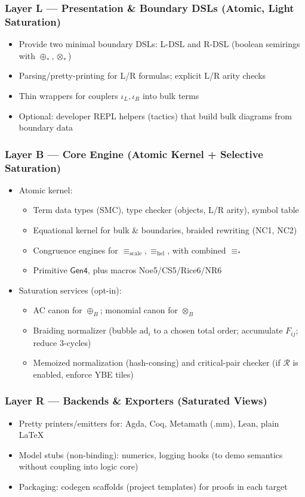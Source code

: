 \subsubsection{Layer L — Presentation \& Boundary DSLs (Atomic, Light Saturation)}
\begin{itemize}
\item Provide two minimal boundary DSLs: L-DSL and R-DSL (boolean semirings with $\oplus_*, \otimes_*$)
\item Parsing/pretty-printing for L/R formulas; explicit L/R arity checks
\item Thin wrappers for couplers $\iota_L, \iota_R$ into bulk terms
\item Optional: developer REPL helpers (tactics) that build bulk diagrams from boundary data
\end{itemize}

\subsubsection{Layer B — Core Engine (Atomic Kernel + Selective Saturation)}
\begin{itemize}
\item Atomic kernel:
  \begin{itemize}
  \item Term data types (SMC), type checker (objects, L/R arity), symbol table
  \item Equational kernel for bulk \& boundaries, braided rewriting (NC1, NC2)
  \item Congruence engines for $\equiv_{\text{scale}}, \equiv_{\text{hel}}$, with combined $\equiv_*$
  \item Primitive $\mathsf{Gen4}$, plus macros Noe5/CS5/Rice6/NR6
  \end{itemize}
\item Saturation services (opt-in):
  \begin{itemize}
  \item AC canon for $\oplus_B$; monomial canon for $\otimes_B$
  \item Braiding normalizer (bubble $\text{ad}_i$ to a chosen total order; accumulate $F_{ij}$; reduce 3-cycles)
  \item Memoized normalization (hash-consing) and critical-pair checker (if $\mathcal{R}$ is enabled, enforce YBE tiles)
  \end{itemize}
\end{itemize}

\subsubsection{Layer R — Backends \& Exporters (Saturated Views)}
\begin{itemize}
\item Pretty printers/emitters for: Agda, Coq, Metamath (.mm), Lean, plain LaTeX
\item Model stubs (non-binding): numerics, logging hooks (to demo semantics without coupling into logic core)
\item Packaging: codegen scaffolds (project templates) for proofs in each target
\end{itemize}

